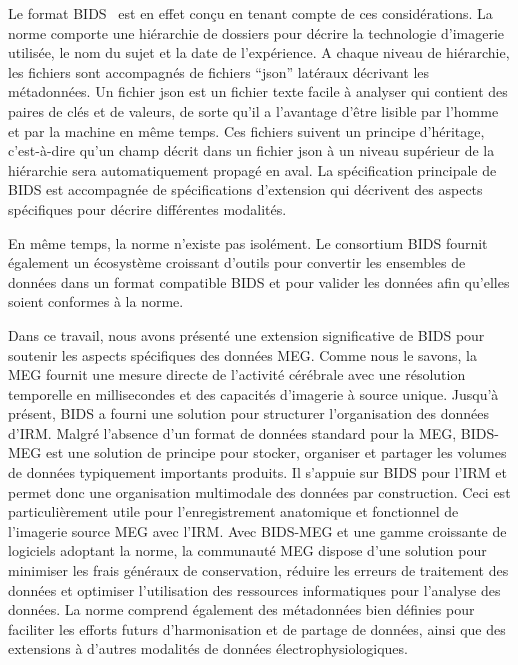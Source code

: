 Le format BIDS~\citep{gorgolewski2016brain} est en effet conçu en tenant compte de ces considérations. La norme comporte une hiérarchie de dossiers pour décrire la technologie d'imagerie utilisée, le nom du sujet et la date de l'expérience. A chaque niveau de hiérarchie, les fichiers sont accompagnés de fichiers “json” latéraux décrivant les métadonnées. Un fichier json est un fichier texte facile à analyser qui contient des paires de clés et de valeurs, de sorte qu'il a l'avantage d'être lisible par l'homme et par la machine en même temps. Ces fichiers suivent un principe d'héritage, c'est-à-dire qu'un champ décrit dans un fichier json à un niveau supérieur de la hiérarchie sera automatiquement propagé en aval. La spécification principale de BIDS est accompagnée de spécifications d'extension qui décrivent des aspects spécifiques pour décrire différentes modalités.

En même temps, la norme n'existe pas isolément. Le consortium BIDS fournit également un écosystème croissant d'outils pour convertir les ensembles de données dans un format compatible BIDS et pour valider les données afin qu'elles soient conformes à la norme.

Dans ce travail, nous avons présenté une extension significative de BIDS pour soutenir les aspects spécifiques des données MEG. Comme nous le savons, la MEG fournit une mesure directe de l'activité cérébrale avec une résolution temporelle en millisecondes et des capacités d'imagerie à source unique. Jusqu'à présent, BIDS a fourni une solution pour structurer l'organisation des données d'IRM. Malgré l'absence d'un format de données standard pour la MEG, BIDS-MEG est une solution de principe pour stocker, organiser et partager les volumes de données typiquement importants produits. Il s'appuie sur BIDS pour l'IRM et permet donc une organisation multimodale des données par construction. Ceci est particulièrement utile pour l'enregistrement anatomique et fonctionnel de l'imagerie source MEG avec l'IRM. Avec BIDS-MEG et une gamme croissante de logiciels adoptant la norme, la communauté MEG dispose d'une solution pour minimiser les frais généraux de conservation, réduire les erreurs de traitement des données et optimiser l'utilisation des ressources informatiques pour l'analyse des données. La norme comprend également des métadonnées bien définies pour faciliter les efforts futurs d'harmonisation et de partage de données, ainsi que des extensions à d'autres modalités de données électrophysiologiques.

